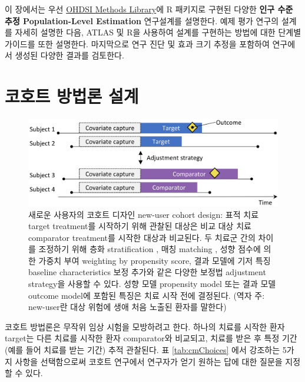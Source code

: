 \documentclass[10.5pt]{book}
\theoremstyle{definition}
\theoremstyle{definition}
\theoremstyle{definition}
\theoremstyle{remark}
\begin{document}
이 장에서는 우선 \href{https://ohdsi.github.io/MethodsLibrary/}{OHDSI
Methods Library}에 R 패키지로 구현된 다양한 \textbf{인구 수준 추정
Population-Level Estimation} 연구설계를 설명한다. 예제 평가 연구의
설계를 자세히 설명한 다음, ATLAS 및 R을 사용하여 설계를 구현하는 방법에
대한 단계별 가이드를 또한 설명한다. 마지막으로 연구 진단 및 효과 크기
추정을 포함하여 연구에서 생성된 다양한 결과를 검토한다.

\section{코호트 방법론 설계}\label{CohortMethod}


\begin{figure}

{\centering \includegraphics[width=0.9\linewidth]{images/PopulationLevelEstimation/cohortMethod} 

}

\caption{새로운 사용자의 코호트 디자인 new-user cohort design: 표적 치료 target treatment를 시작하기 위해 관찰된 대상은 비교 대상 치료 comparator treatment를 시작한 대상과 비교된다. 두 치료군 간의 차이를 조정하기 위해 층화 stratification , 매칭 matching , 성향 점수에 의한 가중치 부여 weighting by propensity score, 결과 모델에 기저 특징 baseline characteristics 보정 추가와 같은 다양한 보정법 adjustment strategy을 사용할 수 있다. 성향 모델 propensity model 또는 결과 모델 outcome model에 포함된 특징은 치료 시작 전에 결정된다. (역자 주: new-user란 대상 위험에 생애 처음 노출된 환자를 말한다) }\label{fig:cohortMethod}
\end{figure}

코호트 방법론은 무작위 임상 시험을 모방하려고 한다. \citep{hernan_2016}
하나의 치료를 시작한 환자 target는 다른 치료를 시작한 환자 comparator와
비교되고, 치료를 받은 후 특정 기간 (예를 들어 치료를 받는 기간) 추적
관찰된다. 표 \ref{tab:cmChoices} 에서 강조하는 5가지 사항을 선택함으로써
코호트 연구에서 연구자가 얻기 원하는 답에 대한 질문을 지정할 수 있다.
 
\end{document}
